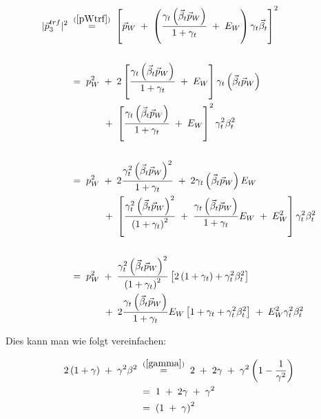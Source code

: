 \documentclass[
a4paper,                                %
twoside,                                %
BCOR1.4cm,                      %
ngerman,                                %
10pt,                           %
headings=normal,                %
headsepline,                    %
clearplainpage, %
final,                                  %
div=14,
parskip=full
]{scrbook}
\begin{document}
\begin{align}
	|\vec{p}_{3}^{trf}|^{2}
\;&\stackrel{\mathrm{(\ref{pWtrf}})}=\;
	\left[
		\vec{p}_{W}\;+\;\left(
			\dfrac{\gamma_{t} \left(\vec{\beta}_{t} \vec{p}_{W}\right)}
			{1 + \gamma_{t}}\;+\;E_{W}
		\right) \gamma_{t} \vec{\beta}_{t}
	\right]^{2}
\nonumber
\\
\nonumber
\\
\;&=\;
	p_{W}^{2}\;+\;2 \left[
		\dfrac{\gamma_{t} \left(\vec{\beta}_{t} \vec{p}_{W}\right)}
		{1 + \gamma_{t}}\;+\;E_{W}
	\right] \gamma_{t} \left(\vec{\beta}_{t} \vec{p}_{W}\right)
\nonumber
\\
&\qquad\;\;\;\;\;+\;
	\left[
		\dfrac{\gamma_{t} \left(\vec{\beta}_{t} \vec{p}_{W}\right)}
		{1 + \gamma_{t}}\;+\;E_{W}
	\right]^{2} \gamma_{t}^{2} \beta_{t}^{2}
\nonumber
\\
\nonumber
\\
\;&=\;
	p_{W}^{2}\;+\;
	2 \dfrac{\gamma_{t}^{2} \left(\vec{\beta}_{t} \vec{p}_{W}\right)^{2}}
	{1 + \gamma_{t}}\;+\;
	2 \gamma_{t} \left(\vec{\beta}_{t} \vec{p}_{W}\right) E_{W}
\nonumber
\\	
&\qquad\;\;\;\;\;+\;
	\left[
		\dfrac{\gamma_{t}^{2} \left(\vec{\beta}_{t} \vec{p}_{W}\right)^{2}}
		{\left(1 + \gamma_{t}\right)^{2}}\;+\;
		\dfrac{\gamma_{t} \left(\vec{\beta}_{t} \vec{p}_{W}\right)}
		{1 + \gamma_{t}} E_{W}\;+\;E_{W}^{2}
	\right] \gamma_{t}^{2} \beta_{t}^{2}
\nonumber
\\
\nonumber
\\
\;&=\;
	p_{W}^{2}\;+\;
	\dfrac{\gamma_{t}^{2} \left(\vec{\beta}_{t} \vec{p}_{W}\right)^{2}}
	{\left(1 + \gamma_{t}\right)^{2}} 
	\left[2 \left(1 + \gamma_{t}\right) + \gamma_{t}^{2} \beta_{t}^{2} \right]
\nonumber
\\	
&\qquad\;\;\;\;\;+\;
	2 \dfrac{\gamma_{t} \left(\vec{\beta}_{t} \vec{p}_{W}\right)}
	{1 + \gamma_{t}}E_{W}
	\left[1 + \gamma_{t} + \gamma_{t}^{2} \beta_{t}^{2} \right]
	\;+\;E_{W}^{2} \gamma_{t}^{2} \beta_{t}^{2}
\nonumber
\end{align}

Dies kann man wie folgt vereinfachen:

\begin{align}
	2 \left(1 + \gamma \right)\;+\;\gamma^{2} \beta^{2}
\;&\stackrel{\mathrm{(\ref{gamma})}}=\;
	2\;+\;2 \gamma\;+\;\gamma^{2} \left(1 - \dfrac{1}{\gamma^{2}} \right)
\nonumber
\\
\;&=\;
	1\;+\;2 \gamma \;+\;\gamma^{2}
\nonumber
\\
\;&=\;
	\left(1\;+\;\gamma \right)^{2}
\nonumber
\end{align}
\end{document}
